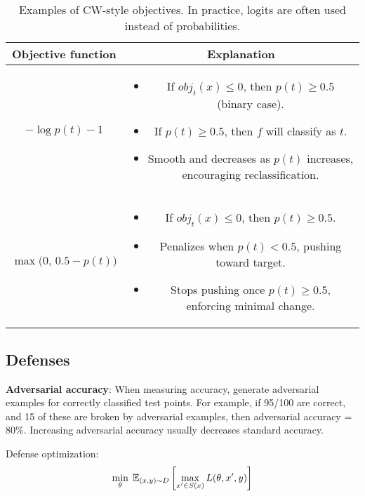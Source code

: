 \documentclass[11pt]{article}
\begin{document}
\begin{table}[h!]
\centering
\renewcommand{\arraystretch}{1.4}
\begin{tabular}{|c|c|}
\hline
\textbf{Objective function} & \textbf{Explanation} \\
\hline
$\displaystyle -\log p(t) - 1$ &
\begin{minipage}[t]{0.65\textwidth}
\begin{itemize}[leftmargin=*]
    \item If $obj_t(x) \le 0$, then $p(t) \ge 0.5$ (binary case).
    \item If $p(t) \ge 0.5$, then $f$ will classify as $t$.
    \item Smooth and decreases as $p(t)$ increases, encouraging reclassification.
\end{itemize}
\end{minipage} \\
\hline
$\displaystyle \max\!\bigl(0,\,0.5 - p(t)\bigr)$ &
\begin{minipage}[t]{0.65\textwidth}
\begin{itemize}[leftmargin=*]
    \item If $obj_t(x) \le 0$, then $p(t) \ge 0.5$.
    \item Penalizes when $p(t) < 0.5$, pushing toward target.
    \item Stops pushing once $p(t) \ge 0.5$, enforcing minimal change.
\end{itemize}
\end{minipage} \\
\hline
\end{tabular}
\caption{Examples of CW-style objectives. In practice, logits are often used instead of probabilities.}
\end{table}


\subsection{Defenses}
\textbf{Adversarial accuracy}: When measuring accuracy, generate adversarial examples for correctly classified test points. For example, if 95/100 are correct, and 15 of these are broken by adversarial examples, then adversarial accuracy = 80\%. Increasing adversarial accuracy usually decreases standard accuracy. 

Defense optimization:
\[
	\min_\theta \; \mathbb{E}_{(x, y) \sim D}\left[ \max_{x' \in S(x)} L(\theta, x', y) \right]
\]
\end{document}
